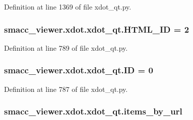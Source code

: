 Definition at line 1369 of file xdot\+\_\+qt.\+py.

\subsubsection[{\texorpdfstring{H\+T\+M\+L\+\_\+\+ID}{HTML_ID}}]{ smacc\+\_\+viewer.\+xdot.\+xdot\+\_\+qt.\+H\+T\+M\+L\+\_\+\+ID = 2}\hypertarget{namespacesmacc__viewer_1_1xdot_1_1xdot__qt_ace182ad67771337ecd21e05fbaefc7bf}{}\label{namespacesmacc__viewer_1_1xdot_1_1xdot__qt_ace182ad67771337ecd21e05fbaefc7bf}


Definition at line 789 of file xdot\+\_\+qt.\+py.

\subsubsection[{\texorpdfstring{ID}{ID}}]{ smacc\+\_\+viewer.\+xdot.\+xdot\+\_\+qt.\+ID = 0}\hypertarget{namespacesmacc__viewer_1_1xdot_1_1xdot__qt_a09a25dacdc4189c77bffc3b4da77ab2c}{}\label{namespacesmacc__viewer_1_1xdot_1_1xdot__qt_a09a25dacdc4189c77bffc3b4da77ab2c}


Definition at line 787 of file xdot\+\_\+qt.\+py.

\subsubsection[{\texorpdfstring{items\+\_\+by\+\_\+url}{items_by_url}}]{\setlength{\rightskip}{0pt plus 5cm}smacc\+\_\+viewer.\+xdot.\+xdot\+\_\+qt.\+items\+\_\+by\+\_\+url}\hypertarget{namespacesmacc__viewer_1_1xdot_1_1xdot__qt_a1ea16c8736c98c601c48a91bae329cca}{}\label{namespacesmacc__viewer_1_1xdot_1_1xdot__qt_a1ea16c8736c98c601c48a91bae329cca}


